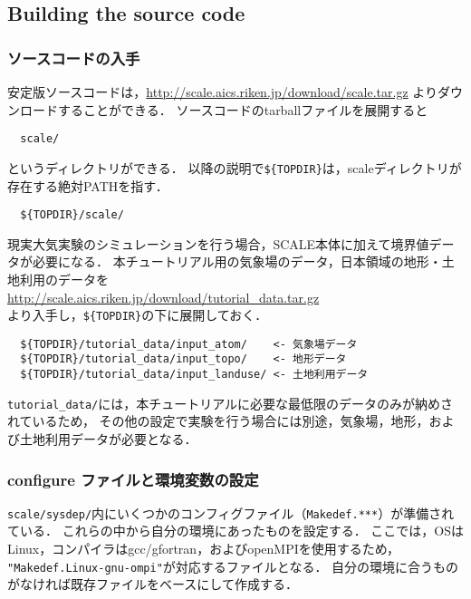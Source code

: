 \subsection{Building the source code} \label{sec:source_code}

\subsubsection{ソースコードの入手}

安定版ソースコードは，\url{http://scale.aics.riken.jp/download/scale.tar.gz}
よりダウンロードすることができる．
ソースコードのtarballファイルを展開すると
\begin{verbatim}
  scale/
\end{verbatim}
というディレクトリができる．
以降の説明で\verb|${TOPDIR}|は，scaleディレクトリが存在する絶対PATHを指す．
\begin{verbatim}
  ${TOPDIR}/scale/
\end{verbatim}


現実大気実験のシミュレーションを行う場合，SCALE本体に加えて境界値データが必要になる．
本チュートリアル用の気象場のデータ，日本領域の地形・土地利用のデータを\\
 \url{http://scale.aics.riken.jp/download/tutorial_data.tar.gz}\\
より入手し，\verb|${TOPDIR}|の下に展開しておく．
\begin{verbatim}
  ${TOPDIR}/tutorial_data/input_atom/    <- 気象場データ
  ${TOPDIR}/tutorial_data/input_topo/    <- 地形データ
  ${TOPDIR}/tutorial_data/input_landuse/ <- 土地利用データ
\end{verbatim}
\verb|tutorial_data/|には，本チュートリアルに必要な最低限のデータのみが納めされているため，
その他の設定で実験を行う場合には別途，気象場，地形，および土地利用データが必要となる．


\subsubsection{configure ファイルと環境変数の設定}

\verb|scale/sysdep/|内にいくつかのコンフィグファイル（\verb|Makedef.***|）が準備されている．
これらの中から自分の環境にあったものを設定する．
ここでは，OSはLinux，コンパイラはgcc/gfortran，およびopenMPIを使用するため，
\verb|"Makedef.Linux-gnu-ompi"|が対応するファイルとなる．
自分の環境に合うものがなければ既存ファイルをベースにして作成する．

